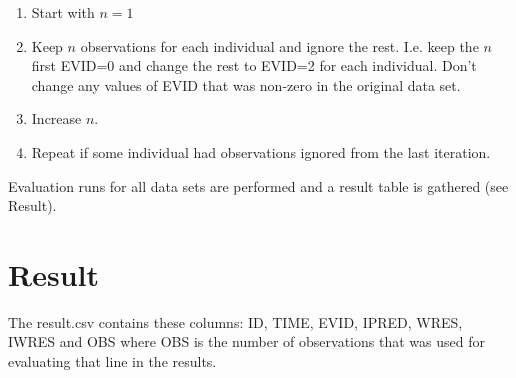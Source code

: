 \begin{enumerate}
    \item Start with $n=1$
    \item Keep $n$ observations for each individual and ignore the rest. I.e. keep the $n$ first EVID=0 and change the rest to EVID=2 for each individual. Don't change any values of EVID that was non-zero in the original data set.
    \item Increase $n$.
    \item Repeat if some individual had observations ignored from the last iteration.
\end{enumerate}

Evaluation runs for all data sets are performed and a result table is gathered (see Result).

\section{Result}

The result.csv contains these columns: ID, TIME, EVID, IPRED, WRES, IWRES and OBS where OBS is the number of observations that was used for evaluating that line in the results.


